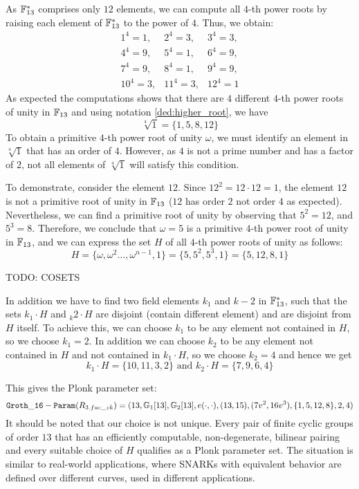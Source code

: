 \begin{example}
As $\mathbb{F}_{13}^*$ comprises only $12$ elements, we can compute all $4$-th power roots by raising each element of $\mathbb{F}_{13}^*$ to the power of $4$. Thus, we obtain:
$$
\begin{array}{lcr}
1^4= 1, &
2^4=3, &
3^4=3, \\
4^4=9, &
5^4=1, &
6^4=9,\\
7^4=9, &
8^4=1, &
9^4=9,\\
10^4=3, &
11^4=3, &
12^4=1
\end{array}
$$
As expected the computations shows that there are $4$ different $4$-th power roots of unity in $\mathbb{F}_{13}$ and using notation \ref{ded:higher_root}, we have
$$
\sqrt[4]{1}= \{1,5,8,12\}
$$
To obtain a primitive $4$-th power root of unity $\omega$, we must identify an element in $\sqrt[4]{1}$ that has an order of $4$. However, as $4$ is not a prime number and has a factor of $2$, not all elements of $\sqrt[4]{1}$ will satisfy this condition.

To demonstrate, consider the element $12$. Since $12^2=12\cdot 12 = 1$, the element $12$ is not a primitive root of unity in $\mathbb{F}_{13}$ ($12$ has order $2$ not order $4$ as expected). Nevertheless, we can find a primitive root of unity by observing that $5^2=12$, and $5^3=8$. Therefore, we conclude that $\omega = 5$ is a primitive $4$-th power root of unity in $\mathbb{F}_{13}$, and we can express the set $H$ of all $4$-th power roots of unity as follows:
$$
H = \{\omega, \omega^2 \ldots, \omega^{n-1}, 1\} = \{5,5^2,5^3,1\} = \{5,12,8,1\}
$$

TODO: COSETS

In addition we have to find two field elements $k_1$ and $k-2$ in $\mathbb{F}_{13}^*$, such that the sets $k_1\cdot H$ and $_k2\cdot H$ are disjoint (contain different element) and are disjoint from $H$ itself. To achieve this, we can choose $k_1$ to be any element not contained in $H$, so we choose $k_1=2$. In addition we can choose $k_2$ to be any element not contained in $H$ and not contained in $k_1\cdot H$, so we choose $k_2=4$ and hence we get
$$
k_1\cdot H = \{10, 11, 3, 2\} \text{ and } k_2\cdot H = \{7, 9, 6, 4\} 
$$ 

This gives the Plonk parameter set:
$$
\mathtt{Groth\_16-Param}(R_{3.fac\_zk})=(13, \mathbb{G}_1[13], \mathbb{G}_2[13], e(\cdot,\cdot), (13,15),(7v^2,16v^3), \{1,5, 12, 8\}, 2, 4)
$$
It should be noted that our choice is not unique. Every pair of finite cyclic groups of order $13$ that has an efficiently computable, non-degenerate, bilinear pairing and every suitable choice of $H$ qualifies as a Plonk parameter set. The situation is similar to real-world applications, where SNARKs with equivalent behavior are defined over different curves, used in different applications.


\end{example}
